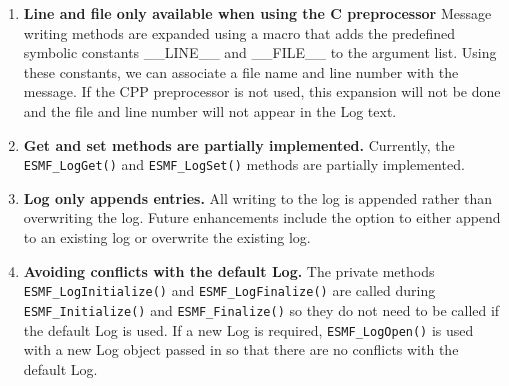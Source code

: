 %

\begin{enumerate}

\item {\bf Line and file only available when using the C preprocessor}
Message writing methods are expanded using a macro that adds the predefined 
symbolic constants \_\_LINE\_\_ and \_\_FILE\_\_ to the argument list.
Using these constants, we can associate a file name and line number with the
message.  If the CPP preprocessor is not used, this expansion will not be done
and the file and line number will not appear in the Log text.

\item{\bf Get and set methods are partially implemented.}
Currently, the {\tt ESMF\_LogGet()} and {\tt ESMF\_LogSet()} methods are 
partially implemented.   

\item{\bf Log only appends entries.}
All writing to the log is appended rather than overwriting the log.  Future 
enhancements include the option to either append to an existing log or 
overwrite the existing log.

\item{\bf Avoiding conflicts with the default Log.}
The private methods {\tt ESMF\_LogInitialize()} and {\tt ESMF\_LogFinalize()} 
are called during {\tt ESMF\_Initialize()} and {\tt ESMF\_Finalize()} so they
do not need to be called if the default Log is used.  If a new Log is required,
{\tt ESMF\_LogOpen()} is used with a new Log object passed in so that there 
are no conflicts with the default Log.

\end{enumerate}
